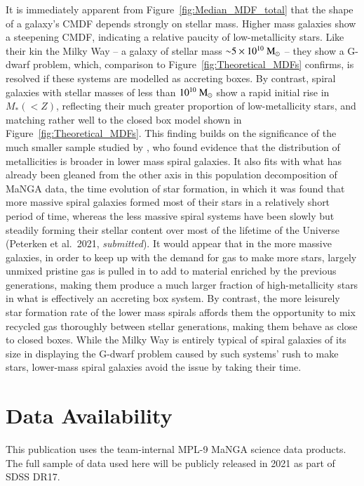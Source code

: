 \documentclass[fleqn,usenatbib]{mnras}
\begin{document}
It is immediately apparent from Figure~\ref{fig:Median_MDF_total} that the shape of a galaxy's CMDF depends strongly on stellar mass. Higher mass galaxies show a steepening CMDF, indicating a relative paucity of low-metallicity stars. Like their kin the Milky Way -- a galaxy of stellar mass ${\sim} 5 \times 10^{10} \ \rm M_{\odot}$ \citep{McMillan2017TheWay} -- they show a G-dwarf problem, which, comparison to Figure~\ref{fig:Theoretical_MDFs} confirms, is resolved if these systems are modelled as accreting boxes. By contrast, spiral galaxies with stellar masses of less than $10^{10} \ \rm M_{\odot}$ show a rapid initial rise in $M_{*}(< Z)$, reflecting their much greater proportion of low-metallicity stars, and matching rather well to the closed box model shown in Figure~\ref{fig:Theoretical_MDFs}. This finding builds on the significance of the much smaller sample studied by \citet{Mejia-Narvaez2020TheSurvey}, who found evidence that the distribution of metallicities is broader in lower mass spiral galaxies. It also fits with what has already been gleaned from the other axis in this population decomposition of MaNGA data, the time evolution of star formation, in which it was found that more massive spiral galaxies formed most of their stars in a relatively short period of time, whereas the less massive spiral systems have been slowly but steadily forming their stellar content over most of the lifetime of the Universe (Peterken et al.\ 2021, \emph{submitted}). It would appear that in the more massive galaxies, in order to keep up with the demand for gas to make more stars, largely unmixed pristine gas is pulled in to add to material enriched by the previous generations, making them produce a much larger fraction of high-metallicity stars in what is effectively an accreting box system. By contrast, the more leisurely star formation rate of the lower mass spirals affords them the opportunity to mix recycled gas thoroughly between stellar generations, making them behave as close to closed boxes. While the Milky Way is entirely typical of spiral galaxies of its size in displaying the G-dwarf problem caused by such systems' rush to make stars, lower-mass spiral galaxies avoid the issue by taking their time.


\section*{Data Availability}

This publication uses the team-internal MPL-9 MaNGA science data products. The full sample of data used here will be publicly released in 2021 as part of SDSS DR17.
\end{document}

